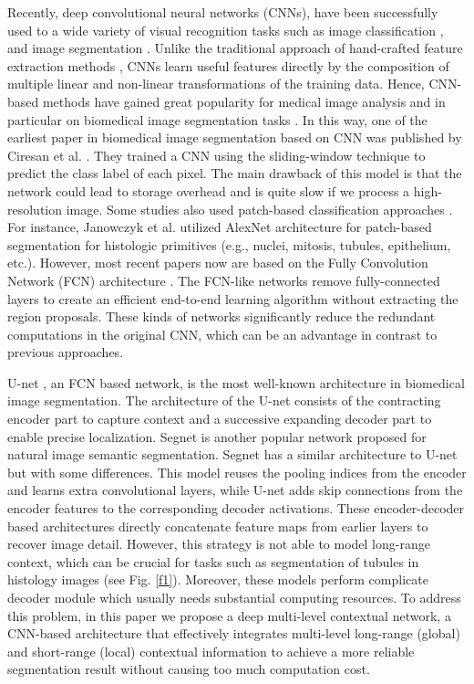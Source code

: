 \documentclass[10pt,twocolumn]{article}
\begin{document}
Recently, deep convolutional neural networks (CNNs), have been successfully used to a wide variety of visual recognition tasks such as image classification \cite{r1,r2}, and image segmentation \cite{r3,r8}. Unlike the traditional approach of hand-crafted feature extraction methods \cite{r21,r22,r23}, CNNs learn useful features directly by the composition of multiple linear and non-linear transformations of the training data. Hence, CNN-based methods have gained great popularity for medical image analysis and in particular on biomedical image segmentation tasks \cite{r14,r24,r25}.
In this way, one of the earliest paper in biomedical image segmentation based on CNN was published by Ciresan et al. \cite{r4}. They trained a CNN using the sliding-window technique to predict the class label of each pixel. The main drawback of this model is that the network could lead to storage overhead and is quite slow if we process a high-resolution image. Some studies also used patch-based classification approaches \cite{r5,r6}. For instance, Janowczyk et al. \cite{r6} utilized AlexNet architecture \cite{r2} for patch-based segmentation for histologic primitives (e.g., nuclei, mitosis, tubules, epithelium, etc.).
However, most recent papers now are based on the Fully Convolution Network (FCN) architecture \cite{r3}. The FCN-like networks remove fully-connected layers to create an efficient end-to-end learning algorithm without extracting the region proposals. These kinds of networks significantly reduce the redundant computations in the original CNN, which can be an advantage in contrast to previous approaches.

U-net \cite{r7}, an FCN based network, is the most well-known architecture in biomedical image segmentation.
The architecture of the U-net consists of the contracting encoder part to capture context and a successive expanding decoder part to enable precise localization.
Segnet \cite{r8} is another popular network proposed for natural image semantic segmentation. Segnet has a similar architecture to U-net but with some differences.
This model reuses the pooling indices from the encoder and learns extra convolutional layers, while U-net adds skip connections from the encoder features to the corresponding decoder activations.
These encoder-decoder based architectures directly concatenate feature maps from earlier layers to recover image detail. However, this strategy is not able to model long-range context, which can be crucial for tasks such as segmentation of tubules in histology images (see Fig. \ref{f1}). Moreover, these models perform complicate decoder module which usually needs substantial computing resources. To address this problem, in this paper we propose a deep multi-level contextual network, a CNN-based architecture that effectively integrates multi-level long-range (global) and short-range (local) contextual information to achieve a more reliable segmentation result without causing too much computation cost.
\end{document}
